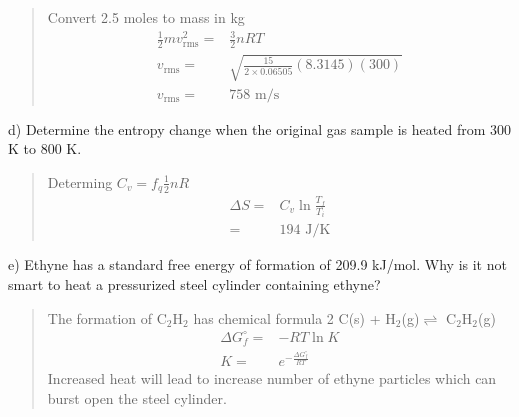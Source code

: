 \documentclass[11pt]{article}
\newcommand{\brian}[1]{
  {\begin{quote}
      \color{blue} #1
  \end{quote}}
}
\begin{document}
\brian{Convert 2.5 moles to mass in kg
  \begin{align*}
    \frac{1}{2}mv^2_\text{rms} = & \frac{3}{2}nRT \\
    v_\text{rms} = & \sqrt{\frac{15}{2\times 0.06505}(8.3145)(300)} \\
    v_\text{rms} = & 758 \text{ m/s}
  \end{align*}
}

d) Determine the entropy change when the original gas sample is heated from 300 K to
800 K.

\brian{Determing $C_v = f_q\frac{1}{2}nR$
  \begin{align*}
    \Delta S = & C_v\ln\frac{T_f}{T_i} \\
    = & 194 \text{ J/K}
  \end{align*}
}

e) Ethyne has a standard free energy of formation of 209.9 kJ/mol. Why is it not smart
to heat a pressurized steel cylinder containing ethyne?

\brian{The formation of C$_2$H$_2$ has chemical formula 2 C(s) + H$_2$(g)$\rightleftharpoons$ C$_2$H$_2$(g)
  \begin{align*}
    \Delta G^\circ_f = & -RT\ln K \\
    K = & e^{-\frac{\Delta G^\circ_f}{RT}}
  \end{align*}
  Increased heat will lead to increase number of ethyne particles which can burst open
  the steel cylinder.
}
\end{document}
